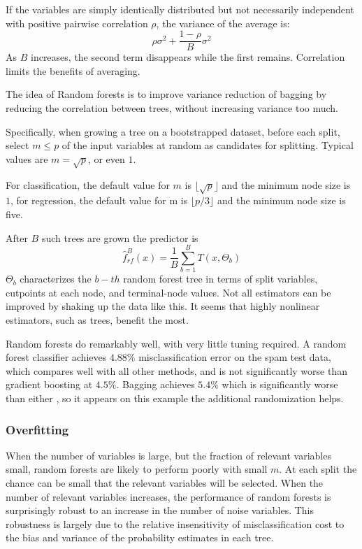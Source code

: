 \documentclass[12pt, letterpaper]{article}
\theoremstyle{definition}
\begin{document}
If the variables are simply identically distributed but not necessarily independent with positive pairwise correlation $\rho$, the variance of the average is:
\begin{equation}
\rho \sigma^2 + \frac{1-\rho}{B}\sigma^2
\end{equation}
As $B$ increases, the second term disappears while the first remains. Correlation limits the benefits of averaging.

The idea of Random forests is to improve variance reduction of bagging by reducing the correlation between trees, without increasing variance too much.

Specifically, when growing a tree on a bootstrapped dataset, before each split, select $m \le p$ of the input variables at random as candidates for splitting. Typical values are $m= \sqrt{p}$, or even $1$.

For classification, the default value for $m$ is $\lfloor{\sqrt{p}}\rfloor$ and the minimum node size is $1$, for regression, the default value for m is $\lfloor{p/3}\rfloor$ and the minimum node size is five.

After $B$ such trees are grown the predictor is 
\begin{equation}
\hat{f}_{rf}^B(x) = \frac{1}{B}\sum_{b=1}^BT(x, \Theta_b) 
\end{equation}
$\Theta_b$ characterizes the $b-th$ random forest tree in terms of split variables, cutpoints at each node, and terminal-node values.
Not all estimators can be improved by shaking up the data like this. It seems that highly nonlinear estimators, such as trees, benefit the most.

Random forests do remarkably well, with very little tuning required. A random forest classifier achieves $4.88\%$ misclassification error on the spam test data, which compares well with all other methods, and is not significantly worse than gradient boosting at $4.5\%$. Bagging achieves $5.4\%$ which is significantly worse than either , so it appears on this example the additional randomization helps.

\subsubsection{Overfitting}
When the number of variables is large, but the fraction of relevant variables small, random forests are likely to perform poorly with small $m$. At each split the chance can be small that the relevant variables will be selected. When the number of relevant variables increases, the performance of random forests is surprisingly robust to an increase in the number of noise variables.  This robustness is largely due to the relative insensitivity of misclassification cost to the bias and variance of the probability estimates in each tree.
\end{document}
